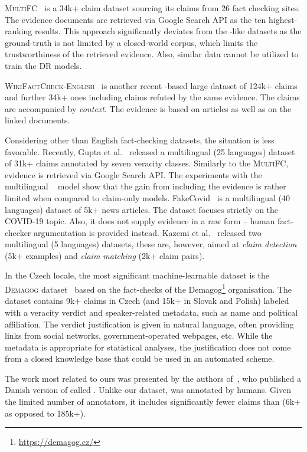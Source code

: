 \textsc{MultiFC}~\cite{augenstein2019multifc} is a 34k+ claim dataset sourcing its claims from 26 fact checking sites.
The evidence documents are retrieved via Google Search API as the ten highest-ranking results.
This approach significantly deviates from the \FEVER-like datasets as the ground-truth is not limited by a closed-world corpus, which limits the trustworthiness of the retrieved evidence.
Also, similar data cannot be utilized to train the DR models.

\textsc{WikiFactCheck-English}~\cite{sathe2020automated} is another recent \Wikipedia-based large dataset of 124k+ claims and further 34k+ ones including claims refuted by the same evidence.
The claims are accompanied by \textit{context}.
The evidence is based on \Wikipedia articles as well as on the linked documents. 

Considering other than English fact-checking datasets, the situation is less favorable.
Recently, Gupta et al.~\cite{gupta2021xfact} released a multilingual (25 languages) dataset of 31k+ claims annotated by seven veracity classes.
Similarly to the \textsc{MultiFC}, evidence is retrieved via Google Search API.
The experiments with the multilingual \BERT~\cite{devlin2019bert} model show that the gain from including the evidence is rather limited when compared to claim-only models.
FakeCovid~\cite{shahi2020fakecovid} is a multilingual (40 languages) dataset of 5k+ news articles.
The dataset focuses strictly on the COVID-19 topic.
Also, it does not supply evidence in a raw form -- human fact-checker argumentation is provided instead. 
Kazemi et al.~\cite{kazemi2021claim} released two multilingual (5 languages) datasets, these are, however, aimed at \textit{claim detection} (5k+ examples) and \textit{claim matching} (2k+ claim pairs).

In the Czech locale, the most significant machine-learnable dataset is the \textsc{Demagog} dataset~\cite{priban-etal-2019-machine} based on the fact-checks of the Demagog\footnote{\url{https://demagog.cz/}} organisation.
The dataset contains 9k+ claims in Czech (and 15k+ in Slovak and Polish) labeled with a veracity verdict and speaker-related metadata, such as name and political affiliation.
The verdict justification is given in natural language, often providing links from social networks, government-operated webpages, etc.
While the metadata is appropriate for statistical analyses, the justification does not come from a closed knowledge base that could be used in an automated scheme.

The work most related to ours was presented by the authors of~\citep{binau2020danish,norregaard2021danfever}, who published a Danish version of \FEN called \FDAN.
Unlike our \FCZ dataset, \FDAN was annotated by humans.
Given the limited number of annotators, it includes significantly fewer claims than \FEN (6k+ as opposed to 185k+).


